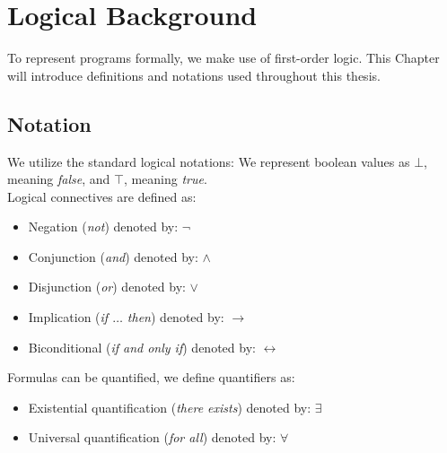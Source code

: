 \section{Logical Background}
To represent programs formally, we make use of first-order logic. This Chapter will introduce definitions and notations used throughout this thesis.

\subsection{Notation}
We utilize the standard logical notations: We represent boolean values as $\bot$, meaning \textsl{false}, and $\top$, meaning \textsl{true}. \\ Logical connectives are defined as:
\begin{itemize}
	\item Negation (\textsl{not}) denoted by: $\neg$
	\item Conjunction (\textsl{and}) denoted by: $\land$
	\item Disjunction (\textsl{or}) denoted by: $\lor$
	\item Implication (\textsl{if $\ldots$ then}) denoted by: $\rightarrow$
	\item Biconditional (\textsl{if and only if}) denoted by: $\leftrightarrow$
\end{itemize}
Formulas can be quantified, we define quantifiers as:
\begin{itemize}
	\item Existential quantification (\textsl{there exists}) denoted by: $\exists$
	\item Universal quantification (\textsl{for all}) denoted by: $\forall$
\end{itemize}

